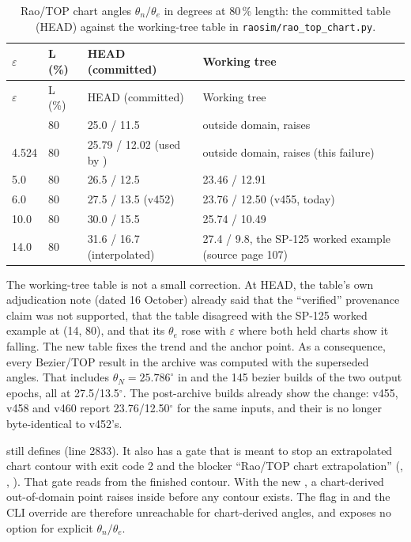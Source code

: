 {\footnotesize
\begin{longtable}{P{1.6cm}P{1.4cm}P{4.6cm}P{6.9cm}}
\caption{Rao/TOP chart angles $\theta_n/\theta_e$ in degrees at 80\,\% length: the committed table (HEAD) against the working-tree table in \texttt{raosim/rao\_top\_chart.py}.}\label{tab:fresh-chart}\\
\toprule
$\varepsilon$ & L (\%) & HEAD (committed) & Working tree\\
\midrule
\endfirsthead
\toprule
$\varepsilon$ & L (\%) & HEAD (committed) & Working tree\\
\midrule
\endhead
\bottomrule
{} & 80 & 25.0 / 11.5 & outside domain, raises\\
4.524 & 80 & 25.79 / 12.02 (used by ) & outside domain, raises (this failure)\\
5.0 & 80 & 26.5 / 12.5 & 23.46 / 12.91\\
6.0 & 80 & 27.5 / 13.5 (v452) & 23.76 / 12.50 (v455, today)\\
10.0 & 80 & 30.0 / 15.5 & 25.74 / 10.49\\
14.0 & 80 & 31.6 / 16.7 (interpolated) & 27.4 / 9.8, the SP-125 worked example (source page 107)\\
\end{longtable}
}

The working-tree table is not a small correction. At HEAD, the table's own adjudication note (dated 16 October) already said that the ``verified'' provenance claim was not supported, that the table disagreed with the SP-125 worked example at (14, 80), and that its $\theta_e$ rose with $\varepsilon$ where both held charts show it falling. The new table fixes the trend and the anchor point. As a consequence, every Bezier/TOP result in the archive was computed with the superseded angles. That includes $\theta_N = 25.786^\circ$ in  and the 145 bezier builds of the two  output epochs, all at 27.5/13.5$^\circ$. The post-archive builds already show the change: v455, v458 and v460 report 23.76/12.50$^\circ$ for the same inputs, and their  is no longer byte-identical to v452's.

 still defines  (line 2833). It also has a gate that is meant to stop an extrapolated chart contour with exit code 2 and the blocker ``Rao/TOP chart extrapolation'' (, , ). That gate reads  from the finished contour. With the new , a chart-derived out-of-domain point raises inside  before any contour exists. The flag  in  and the CLI override are therefore unreachable for chart-derived angles, and  exposes no option for explicit $\theta_n/\theta_e$.

